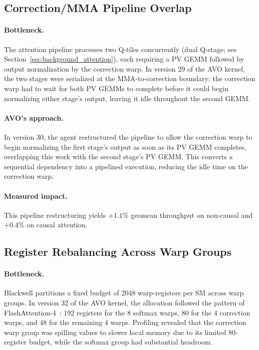 \documentclass{article}
\begin{document}
\subsection{Correction/MMA Pipeline Overlap}
\label{sec:analysis_split}

\paragraph{Bottleneck.}
The attention pipeline processes two Q-tiles concurrently (dual Q-stage; see Section~\ref{sec:background_attention}), each requiring a PV GEMM followed by output normalization by the correction warp.
In version 29 of the AVO kernel, the two stages were serialized at the MMA-to-correction boundary: the correction warp had to wait for both PV GEMMs to complete before it could begin normalizing either stage's output, leaving it idle throughout the second GEMM.

\paragraph{AVO's approach.}
In version 30, the agent restructured the pipeline to allow the correction warp to begin normalizing the first stage's output as soon as its PV GEMM completes, overlapping this work with the second stage's PV GEMM.
This converts a sequential dependency into a pipelined execution, reducing the idle time on the correction warp.

\paragraph{Measured impact.}
This pipeline restructuring yields $+1.1\%$ geomean throughput on non-causal and $+0.4\%$ on causal attention.

\subsection{Register Rebalancing Across Warp Groups}
\label{sec:analysis_registers}

\paragraph{Bottleneck.}
Blackwell partitions a fixed budget of 2048 warp-registers per SM across warp groups.
In version 32 of the AVO kernel, the allocation followed the pattern of FlashAttention-4~\citep{zadouri2026flashattention4}: 192 registers for the 8 softmax warps, 80 for the 4 correction warps, and 48 for the remaining 4 warps.
Profiling revealed that the correction warp group was spilling values to slower local memory due to its limited 80-register budget, while the softmax group had substantial headroom.
\end{document}
